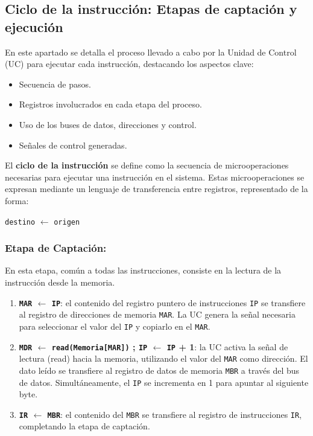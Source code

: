 \documentclass[12pt,oneside]{templates/unerthesis}
\providecommand{\tightlist}{%
  \setlength{\itemsep}{0pt}\setlength{\parskip}{0pt}}
\begin{document}
\hypertarget{ciclo-de-la-instrucciuxf3n-etapas-de-captaciuxf3n-y-ejecuciuxf3n}{%
\subsection{Ciclo de la instrucción: Etapas de captación y ejecución}\label{ciclo-de-la-instrucciuxf3n-etapas-de-captaciuxf3n-y-ejecuciuxf3n}}

En este apartado se detalla el proceso llevado a cabo por la Unidad de Control (UC) para ejecutar cada instrucción, destacando los aspectos clave:

\begin{itemize}
\tightlist
\item
  Secuencia de pasos.
\item
  Registros involucrados en cada etapa del proceso.
\item
  Uso de los buses de datos, direcciones y control.
\item
  Señales de control generadas.
\end{itemize}

El \textbf{ciclo de la instrucción} se define como la secuencia de microoperaciones necesarias para ejecutar una instrucción en el sistema. Estas microoperaciones se expresan mediante un lenguaje de transferencia entre registros, representado de la forma:

\texttt{destino} \(\leftarrow\) \texttt{origen}

\hypertarget{etapa-de-captaciuxf3n}{%
\subsubsection{Etapa de Captación:}\label{etapa-de-captaciuxf3n}}

En esta etapa, común a todas las instrucciones, consiste en la lectura de la instrucción desde la memoria.

\begin{enumerate}
\def\labelenumi{\arabic{enumi}.}
\tightlist
\item
  \textbf{\texttt{MAR} \(\leftarrow\) \texttt{IP}}:
  el contenido del registro puntero de instrucciones \texttt{IP} se transfiere al registro de direcciones de memoria \texttt{MAR}. La UC genera la señal necesaria para seleccionar el valor del \texttt{IP} y copiarlo en el \texttt{MAR}.
\item
  \textbf{\texttt{MDR} \(\leftarrow\) \texttt{read(Memoria{[}MAR{]})} ; \texttt{IP} \(\leftarrow\) \texttt{IP} + 1}:
  la UC activa la señal de lectura (read) hacia la memoria, utilizando el valor del \texttt{MAR} como dirección. El dato leído se transfiere al registro de datos de memoria \texttt{MBR} a través del bus de datos. Simultáneamente, el \texttt{IP} se incrementa en 1 para apuntar al siguiente byte.
\item
  \textbf{\texttt{IR} \(\leftarrow\) \texttt{MBR}}:
  el contenido del \texttt{MBR} se transfiere al registro de instrucciones \texttt{IR}, completando la etapa de captación.
\end{enumerate}
\end{document}
